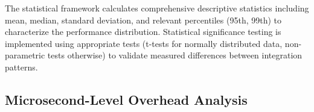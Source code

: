 
The statistical framework calculates comprehensive descriptive statistics including mean, median, standard deviation, and relevant percentiles (95th, 99th) to characterize the performance distribution. Statistical significance testing is implemented using appropriate tests (t-tests for normally distributed data, non-parametric tests otherwise) to validate measured differences between integration patterns.

\subsection{Microsecond-Level Overhead Analysis}

